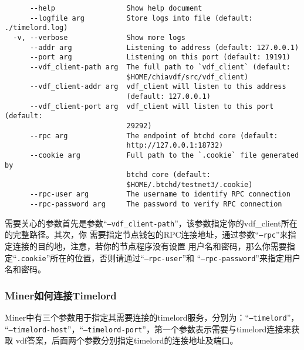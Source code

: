 \begin{flushleft}
\begin{verbatim}
      --help                 Show help document
      --logfile arg          Store logs into file (default: ./timelord.log)
  -v, --verbose              Show more logs
      --addr arg             Listening to address (default: 127.0.0.1)
      --port arg             Listening on this port (default: 19191)
      --vdf_client-path arg  The full path to `vdf_client` (default:
                             $HOME/chiavdf/src/vdf_client)
      --vdf_client-addr arg  vdf_client will listen to this address
                             (default: 127.0.0.1)
      --vdf_client-port arg  vdf_client will listen to this port (default:
                             29292)
      --rpc arg              The endpoint of btchd core (default:
                             http://127.0.0.1:18732)
      --cookie arg           Full path to the `.cookie` file generated by
                             btchd core (default:
                             $HOME/.btchd/testnet3/.cookie)
      --rpc-user arg         The username to identify RPC connection
      --rpc-password arg     The password to verify RPC connection
\end{verbatim}
\normalsize
\begin{flushleft}
    需要关心的参数首先是参数``\texttt{--vdf_client-path}''，该参数指定你的vdf\_client所在的完整路径。其次，你
    需要指定节点钱包的RPC连接地址，通过参数``\texttt{--rpc}''来指定连接的目的地，注意，若你的节点程序没有设置
    用户名和密码，那么你需要指定``\texttt{.cookie}''所在的位置，否则请通过``\texttt{--rpc-user}''和
    ``\texttt{--rpc-password}''来指定用户名和密码。
\end{flushleft}
\subsubsection{Miner如何连接Timelord}
\begin{flushleft}
    Miner中有三个参数用于指定其需要连接的timelord服务，分别为：``\texttt{--timelord}''，
    ``\texttt{--timelord-host}''，``\texttt{--timelord-port}''，第一个参数表示需要与timelord连接来获取
    vdf答案，后面两个参数分别指定timelord的连接地址及端口。
\end{flushleft}

\end{flushleft}
